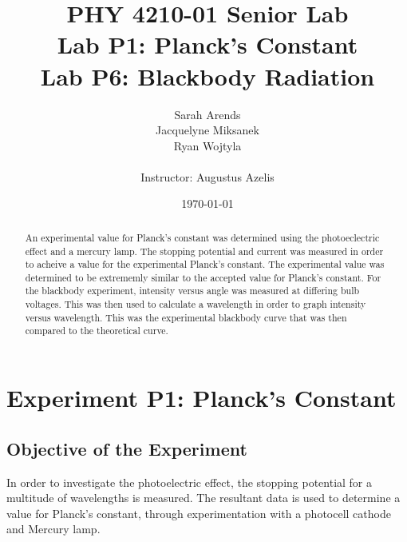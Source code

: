 \documentclass[a4paper]{article}
\title{PHY 4210-01 Senior Lab \\Lab P1: Planck's Constant\\Lab P6: Blackbody Radiation}
\author{Sarah Arends \\
        Jacquelyne Miksanek \\
        Ryan Wojtyla \\ \\
        Instructor: Augustus Azelis}
\date{\today}
\begin{document}
\maketitle

\begin{abstract}

\qq An experimental value for Planck's constant was determined using
the photoeclectric effect and a mercury lamp. The stopping potential
and current was measured in order to acheive a value for the
experimental Planck's constant. The experimental value was determined
to be extrememly similar to the accepted value for Planck's
constant. For the blackbody experiment, intensity versus angle was
measured at differing bulb voltages. This was then used to calculate a
wavelength in order to graph intensity versus wavelength. This was the
experimental blackbody curve that was then compared to the theoretical
curve.

\end{abstract}

\newpage

\tableofcontents

\newpage

\section{Experiment P1: Planck's Constant}

\subsection{Objective of the Experiment}
\qq In order to investigate the photoelectric effect, the stopping
potential for a multitude of wavelengths is measured. The resultant
data is used to determine a value for Planck's constant, through
experimentation with a photocell cathode and Mercury lamp.
\end{document}
